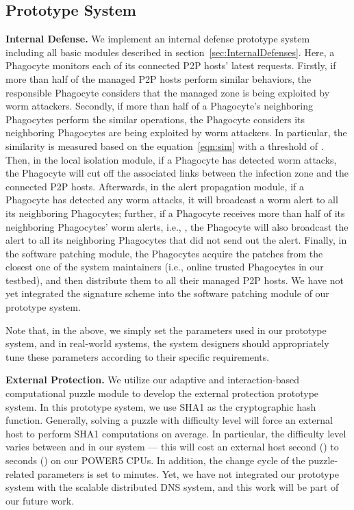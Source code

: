 \documentclass[times,10pt,twocolumn]{article}
\begin{document}
\subsection{Prototype System}
\label{subsec:internal_prototype}


\textbf{Internal Defense.} We implement an internal defense
prototype system including all basic modules described in
section~\ref{sec:InternalDefenses}. Here, a Phagocyte monitors each
of its connected P2P hosts' latest  requests. Firstly, if more
than half of the managed P2P hosts perform similar behaviors, the
responsible Phagocyte considers that the managed zone is being
exploited by worm attackers. Secondly, if more than half of a
Phagocyte's neighboring Phagocytes perform the similar operations,
the Phagocyte considers its neighboring Phagocytes are being
exploited by worm attackers. In particular, the similarity is
measured based on the equation~\ref{eqn:sim} with a threshold
 of . Then, in the local isolation module, if a
Phagocyte has detected worm attacks, the Phagocyte will cut off the
associated links between the infection zone and the connected P2P
hosts. Afterwards, in the alert propagation module, if a Phagocyte
has detected any worm attacks, it will broadcast a worm alert to all
its neighboring Phagocytes; further, if a Phagocyte receives more
than half of its neighboring Phagocytes' worm alerts, i.e.,
, the Phagocyte will also broadcast the alert to all
its neighboring Phagocytes that did not send out the alert. Finally,
in the software patching module, the Phagocytes acquire the patches
from the closest one of the system maintainers (i.e.,  online
trusted Phagocytes in our testbed), and then distribute them to all
their managed P2P hosts. We have not yet integrated the signature
scheme into the software patching module of our prototype system.

Note that, in the above, we simply set the parameters used in our
prototype system, and in real-world systems, the system designers
should appropriately tune these parameters according to their
specific requirements.




\textbf{External Protection.} We utilize our adaptive and
interaction-based computational puzzle module to develop the
external protection prototype system. In this prototype system, we
use SHA1 as the cryptographic hash function. Generally, solving a
puzzle with difficulty level  will force an external host to
perform  SHA1 computations on average. In particular, the
difficulty level  varies between  and  in our system
--- this will cost an external host  second ()
to  seconds () on our POWER5 CPUs. In addition, the
change cycle of the puzzle-related parameters is set to  minutes.
Yet, we have not integrated our prototype system with the scalable
distributed DNS system, and this work will be part of our future
work.
\end{document}
